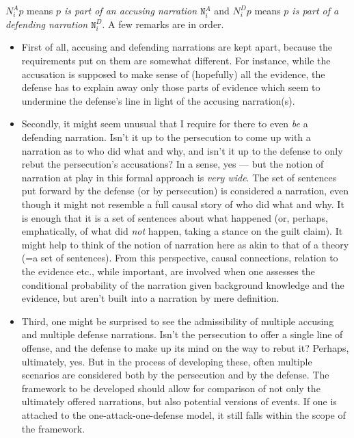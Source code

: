 \documentclass[10pt,leqno]{article}
\begin{document}
 $N^A_ip$ means \emph{$p$ is part of an accusing narration $\mathtt{N}^A_i$} and
 $N^D_ip$ means \emph{$p$ is part of a defending narration $\mathtt{N}^D_i$}.  A few remarks are in order. 
 \begin{itemize}
 \item First of all, accusing and defending narrations are kept apart, because the requirements put on them are somewhat different. For instance, while the accusation is supposed to make sense of (hopefully) all the evidence, the defense has to explain away only those parts of evidence which seem to undermine the defense's line in light of the accusing narration(s). 
 \item Secondly,  it might seem unusual that I require for there to even \emph{be} a defending narration. Isn't it up to the persecution to come up with a narration as to who did what and why, and isn't it up to the defense to only rebut the persecution's accusations? In a sense, yes --- but the notion of narration at play in this formal approach is \emph{very wide}. The set of sentences put forward by the defense (or by persecution) is considered a narration, even though it might not resemble a full causal story of who did what and why. It is enough that it is a set of sentences about  what happened (or, perhaps, emphatically, of what did \emph{not} happen, taking a stance on the guilt claim). It might help to think of the notion of narration here as akin to that of a theory (=a set of sentences). From this perspective, causal connections, relation to the evidence etc., while important, are  involved when one assesses the conditional probability of the narration given background knowledge and the evidence, but aren't built into a narration by mere definition.
 
 \item Third, one might be surprised to see the admissibility of multiple accusing and multiple defense narrations. Isn't the persecution to offer a single line of offense, and the defense to make up its mind on the way to rebut it? Perhaps, ultimately, yes. But in the process of developing these, often multiple scenarios are considered both by the persecution and  by the defense.  The framework to be developed should allow for comparison of not only the ultimately offered narrations, but also potential versions of events. If one is attached to the one-attack-one-defense model, it still falls within the scope of the framework.
 
\end{itemize}
\end{document}
